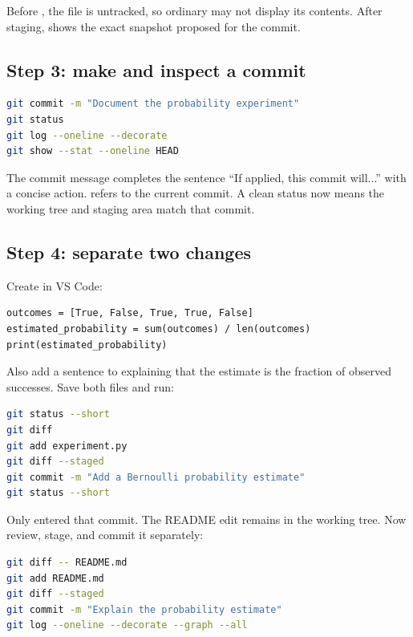 Before , the file is untracked, so ordinary  may not
display its contents. After staging,  shows the exact
snapshot proposed for the commit.

\subsection*{Step 3: make and inspect a commit}

\begin{lstlisting}[language=bash,numbers=none]
git commit -m "Document the probability experiment"
git status
git log --oneline --decorate
git show --stat --oneline HEAD
\end{lstlisting}

The commit message completes the sentence ``If applied, this commit will...''
with a concise action.  refers to the current commit. A clean status
now means the working tree and staging area match that commit.

\subsection*{Step 4: separate two changes}

Create  in VS Code:

\begin{lstlisting}
outcomes = [True, False, True, True, False]
estimated_probability = sum(outcomes) / len(outcomes)
print(estimated_probability)
\end{lstlisting}

Also add a sentence to  explaining that the estimate is the
fraction of observed successes. Save both files and run:

\begin{lstlisting}[language=bash,numbers=none]
git status --short
git diff
git add experiment.py
git diff --staged
git commit -m "Add a Bernoulli probability estimate"
git status --short
\end{lstlisting}

Only  entered that commit. The README edit remains in the
working tree. Now review, stage, and commit it separately:

\begin{lstlisting}[language=bash,numbers=none]
git diff -- README.md
git add README.md
git diff --staged
git commit -m "Explain the probability estimate"
git log --oneline --decorate --graph --all
\end{lstlisting}

